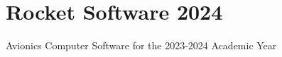 \chapter{Rocket Software 2024}
\hypertarget{md__r_e_a_d_m_e}{}\label{md__r_e_a_d_m_e}
\label{md__r_e_a_d_m_e_autotoc_md0}%
%
 Avionics Computer Software for the 2023-\/2024 Academic Year 
